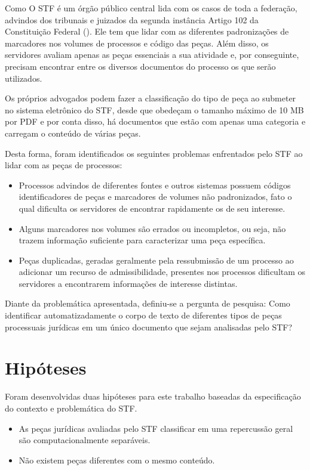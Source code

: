 Como O STF é um órgão público central lida com os casos de toda a federação, advindos dos tribunais e juizados da segunda instância Artigo 102 da Constituição Federal (\citeyear{BRASIL1988}). Ele tem que lidar com as diferentes padronizações de marcadores nos volumes de processos e código das peças. Além disso, os servidores avaliam apenas as peças essenciais a sua atividade e, por conseguinte, precisam encontrar entre os diversos documentos do processo os que serão utilizados.

Os próprios advogados podem fazer a classificação do tipo de peça ao submeter no sistema eletrônico do STF, desde que obedeçam o tamanho máximo de 10 MB por PDF \cite{STF2010} e por conta disso, há documentos que estão com apenas uma categoria e carregam o conteúdo de várias peças.

Desta forma, foram identificados os seguintes problemas enfrentados pelo STF ao lidar com as peças de processos:

\begin{itemize}
	\item Processos advindos de diferentes fontes e outros sistemas possuem códigos identificadores de peças e marcadores de volumes não padronizados, fato o qual dificulta os servidores de encontrar rapidamente os de seu interesse.
    \item Alguns marcadores nos volumes são errados ou incompletos, ou seja, não trazem informação suficiente para caracterizar uma peça específica.
    \item Peças duplicadas, geradas geralmente pela ressubmissão de um processo ao adicionar um recurso de admissibilidade, presentes nos processos dificultam os servidores a encontrarem informações de interesse distintas.
\end{itemize}

Diante da problemática apresentada, definiu-se a pergunta de pesquisa: Como identificar automatizadamente o corpo de texto de diferentes tipos de peças processuais jurídicas em um único documento que sejam analisadas pelo STF?

\section{Hipóteses}

Foram desenvolvidas duas hipóteses \cite{GIL2002} para este trabalho baseadas da especificação do contexto e problemática do STF. 

\begin{itemize}
	\item As peças jurídicas avaliadas pelo STF classificar em uma repercussão geral são computacionalmente separáveis.
    \item Não existem peças diferentes com o mesmo conteúdo.
\end{itemize}

